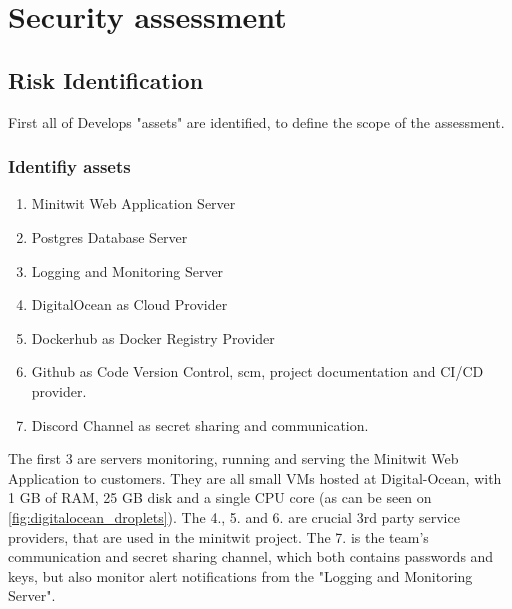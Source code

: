 \section{Security assessment}\label{app:security_ass}

\subsection{Risk Identification}

First all of Develops "assets" are identified, to define the scope of the assessment. 
\subsubsection{Identifiy assets}
\begin{enumerate}
    \item Minitwit Web Application Server
    \item Postgres Database Server
    \item Logging and Monitoring Server
    \item DigitalOcean as Cloud Provider
    \item Dockerhub as Docker Registry Provider
    \item Github as Code Version Control, \acrshort{scm}, project documentation and CI/CD provider.
    \item Discord Channel as secret sharing and communication.
\end{enumerate}

The first 3 are servers monitoring, running and serving the Minitwit Web Application to customers. They are all small VMs hosted at Digital-Ocean, with 1 GB of RAM, 25 GB disk and a single CPU core (as can be seen on \autoref{fig:digitalocean_droplets}). 
The 4., 5. and 6. are crucial 3rd party service providers, that are used in the minitwit project.
The 7. is the team's communication and secret sharing channel, which both contains passwords and keys, but also monitor alert notifications from the "Logging and Monitoring Server".  


